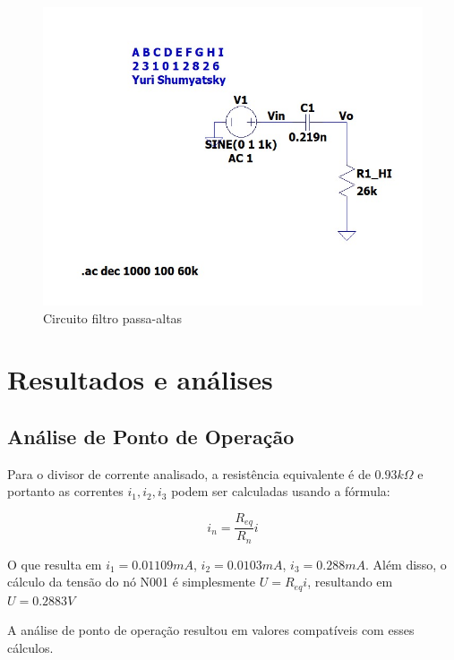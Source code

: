 \documentclass[10pt,twocolumn,letterpaper]{article}
\begin{document}
\begin{figure}[h]
\caption{Circuito filtro passa-altas}
\includegraphics[scale=0.2]{figuras/fig2}
\end{figure}

\section{Resultados e análises}

\subsection{ Análise de Ponto de Operação}

Para o divisor de corrente analisado, a resistência equivalente é de $0.93k\Omega$ e portanto as correntes $i_1, i_2, i_3$ podem ser calculadas usando a fórmula:

\[i_n = \frac{R_{eq}}{R_n}i\]

O que resulta em $i_1 = 0.01109mA$, $i_2 = 0.0103mA$, $i_3 = 0.288mA$. Além disso, o cálculo da tensão do nó N001 é simplesmente $U=R_{eq}i$, resultando em $U=0.2883V$

A análise de ponto de operação resultou em valores compatíveis com esses cálculos.
\end{document}
